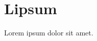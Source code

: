 \documentclass{article}
\begin{document}
\section{Lipsum}
Lorem ipsum dolor sit amet.
\end{document}
